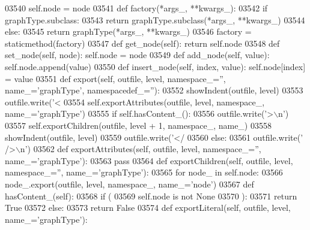 \begin{DoxyCode}
{{{{{{{{{{{{{{{{{{{{{{{{{{{{{{{{{{{{{{{{{{{{{{{{{{{{{{{{{{{{{{{{{{{{{{{{{{{{{{{{{{{{{{{{{{{{{{{{{{{{{{{{{{{{{{{{{{{{{{{{{{{{{{{{{{{{{{{{{{{{{{{{{{{{{{{{{{{{{{{{{{{{{{{{{{{{{{{{{{{{{{{{{{{{{{{{{{{{{{{{{{{{{{{{{{{{{{{{{{{{{{{{{{{{{{03540             self.node = node
03541     \textcolor{keyword}{def }factory(*args\_, **kwargs\_):
03542         \textcolor{keywordflow}{if} graphType.subclass:
03543             \textcolor{keywordflow}{return} graphType.subclass(*args\_, **kwargs\_)
03544         \textcolor{keywordflow}{else}:
03545             \textcolor{keywordflow}{return} graphType(*args\_, **kwargs\_)
03546     factory = staticmethod(factory)
03547     \textcolor{keyword}{def }get_node(self): \textcolor{keywordflow}{return} self.node
03548     \textcolor{keyword}{def }set_node(self, node): self.node = node
03549     \textcolor{keyword}{def }add_node(self, value): self.node.append(value)
03550     \textcolor{keyword}{def }insert_node(self, index, value): self.node[index] = value
03551     \textcolor{keyword}{def }export(self, outfile, level, namespace\_='', name\_='graphType', namespacedef\_=''):
03552         showIndent(outfile, level)
03553         outfile.write(\textcolor{stringliteral}{'<%
03554         self.exportAttributes(outfile, level, namespace\_, name\_=\textcolor{stringliteral}{'graphType'})
03555         \textcolor{keywordflow}{if} self.hasContent_():
03556             outfile.write(\textcolor{stringliteral}{'>\(\backslash\)n'})
03557             self.exportChildren(outfile, level + 1, namespace\_, name\_)
03558             showIndent(outfile, level)
03559             outfile.write(\textcolor{stringliteral}{'</%
03560         \textcolor{keywordflow}{else}:
03561             outfile.write(\textcolor{stringliteral}{' />\(\backslash\)n'})
03562     \textcolor{keyword}{def }exportAttributes(self, outfile, level, namespace\_='', name\_='graphType'):
03563         \textcolor{keywordflow}{pass}
03564     \textcolor{keyword}{def }exportChildren(self, outfile, level, namespace\_='', name\_='graphType'):
03565         \textcolor{keywordflow}{for} node\_ \textcolor{keywordflow}{in} self.node:
03566             node\_.export(outfile, level, namespace\_, name\_=\textcolor{stringliteral}{'node'})
03567     \textcolor{keyword}{def }hasContent_(self):
03568         \textcolor{keywordflow}{if} (
03569             self.node \textcolor{keywordflow}{is} \textcolor{keywordflow}{not} \textcolor{keywordtype}{None}
03570             ):
03571             \textcolor{keywordflow}{return} \textcolor{keyword}{True}
03572         \textcolor{keywordflow}{else}:
03573             \textcolor{keywordflow}{return} \textcolor{keyword}{False}
03574     \textcolor{keyword}{def }exportLiteral(self, outfile, level, name\_='graphType'):
}}}}}}}}}}}}}}}}}}}}}}}}}}}}}}}}}}}}}}}}}}}}}}}}}}}}}}}}}}}}}}}}}}}}}}}}}}}}}}}}}}}}}}}}}}}}}}}}}}}}}}}}}}}}}}}}}}}}}}}}}}}}}}}}}}}}}}}}}}}}}}}}}}}}}}}}}}}}}}}}}}}}}}}}}}}}}}}}}}}}}}}}}}}}}}}}}}}}}}}}}}}}}}}}}}}}}}}}}}}}}}}}}}}}}}}}
\end{DoxyCode}
